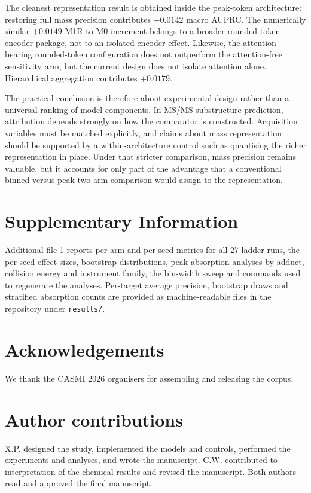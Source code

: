 \documentclass[11pt]{article}
\begin{document}
The cleanest representation result is obtained inside the peak-token architecture: restoring full mass precision contributes $+0.0142$ macro AUPRC. The numerically similar $+0.0149$ M1R-to-M0 increment belongs to a broader rounded token-encoder package, not to an isolated encoder effect. Likewise, the attention-bearing rounded-token configuration does not outperform the attention-free sensitivity arm, but the current design does not isolate attention alone. Hierarchical aggregation contributes $+0.0179$.

The practical conclusion is therefore about experimental design rather than a universal ranking of model components. In MS/MS substructure prediction, attribution depends strongly on how the comparator is constructed. Acquisition variables must be matched explicitly, and claims about mass representation should be supported by a within-architecture control such as quantising the richer representation in place. Under that stricter comparison, mass precision remains valuable, but it accounts for only part of the advantage that a conventional binned-versus-peak two-arm comparison would assign to the representation.

\section*{Supplementary Information}
Additional file 1 reports per-arm and per-seed metrics for all 27 ladder runs, the per-seed effect sizes, bootstrap distributions, peak-absorption analyses by adduct, collision energy and instrument family, the bin-width sweep and commands used to regenerate the analyses. Per-target average precision, bootstrap draws and stratified absorption counts are provided as machine-readable files in the repository under \texttt{results/}.

\section*{Acknowledgements}
We thank the CASMI 2026 organisers for assembling and releasing the corpus.

\section*{Author contributions}
X.P. designed the study, implemented the models and controls, performed the experiments and analyses, and wrote the manuscript. C.W. contributed to interpretation of the chemical results and revised the manuscript. Both authors read and approved the final manuscript.
\end{document}

